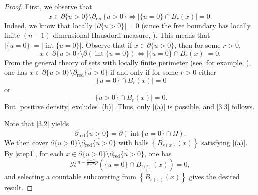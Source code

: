 \documentclass[11pt, reqno]{amsart}
\numberwithin{equation}{section}
\numberwithin{theorem}{section}
\numberwithin{lemma}{section}
\numberwithin{corollary}{section}
\numberwithin{remark}{section}
\numberwithin{proposition}{section}
\numberwithin{definition}{section}
\newcommand{\reduced}{\operatorname{red}}
\newcommand{\interior}{\operatorname{int}}
\begin{document}
\begin{proof} 
    First, we observe that
    \begin{equation}\label{3.3}
    x\in\partial\{u>0\}\setminus\overline{\partial_{\reduced}\{u>0\}}\iff|\{u=0\}\cap B_r(x)|=0.
    \end{equation}
    Indeed, we know that locally $|\partial\{u>0\}|=0$ (since the free boundary has locally finite $(n-1)$-dimensional Hausdorff measure, \cite[Theorem 6.1]{ATU25}). This means that $|\{u=0\}|=|\interior\{u=0\}|$. Observe that if $x\in\partial\{u>0\}$, then for some $r>0$,
    \begin{equation}\label{3.2}
    x\in\partial\{u>0\}\setminus\partial(\interior\{u=0\}) \iff |\{u=0\}\cap B_r(x)|=0.
    \end{equation}
    From the general theory of sets with locally finite perimeter (see, for example, \cite[Proposition 12.19, (15.3) and (16.27)]{M12}), one has $x\in \partial\{u>0\}\setminus\overline{\partial_{\reduced}\{u>0\}}$ if and only if for some $r>0$ either
    \begin{equation}\label{(a)}
    |\{u=0\}\cap B_r(x)|=0
    \end{equation}
    or
    \begin{equation}\label{(b)}
    |\{u>0\}\cap B_r(x)|=0.
    \end{equation}
    But \eqref{positive density} excludes \eqref{(b)}. Thus, only \eqref{(a)} is possible, and \eqref{3.3} follows. 
    
    Note that \eqref{3.2} yields
    $$
    \overline{\partial_{\reduced}\{u>0\}}=\partial\left(\interior\{u=0\}\cap\Omega\right).
    $$
    We then cover $\partial\{u>0\}\setminus\overline{\partial_{\reduced}\{u>0\}}$ with balls $\left\{B_{r(x)}(x)\right\}$ satisfying \eqref{(a)}. By \eqref{step1}, for each $x\in\partial\{u>0\}\setminus\overline{\partial_{\reduced}\{u>0\}}$, one has
    $$
    \mathcal{H}^{n-\frac{2-\gamma}{p-\gamma}p}\left(\{u=0\}\cap B_{\frac{r(x)}{3}}(x)\right)=0,
    $$
    and selecting a countable subcovering from $\left\{B_{r(x)}(x)\right\}$ gives the desired result.
\end{proof}
\end{document}
